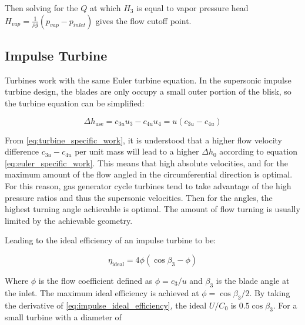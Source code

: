 Then solving for the $Q$ at which $H_3$ is equal to vapor pressure head $H_{vap}=\frac{1}{\rho g}\left(p_{vap}-p_{inlet}\right)$ gives the flow cutoff point.




\subsection{Impulse Turbine}


Turbines work with the same Euler turbine equation. In the supersonic impulse turbine design, the blades are only occupy a small outer portion of the blisk, so the turbine equation can be simplified:

\begin{equation}
    \Delta h_{\textrm{use}}=c_{3u}u_3-c_{4u}u_4=u(c_{3u}-c_{4u})
    \label{eq:turbine_specific_work}
\end{equation}

From \cref{eq:turbine_specific_work}, it is understood that a higher flow velocity difference $c_{3u}-c_{4u}$ per unit mass will lead to a higher $\Delta h_0$ according to equation \cref{eq:euler_specific_work}. This means that high absolute velocities, and for the maximum amount of the flow angled in the circumferential direction is optimal. For this reason, gas generator cycle turbines tend to take advantage of the high pressure ratios and thus the supersonic velocities. Then for the angles, the highest turning angle achievable is optimal. The amount of flow turning is usually limited by the achievable geometry.



Leading to the ideal efficiency of an impulse turbine to be:

\begin{equation}
    \eta_{\textrm{ideal}} = 4\phi(\cos\beta_3-\phi)
    \label{eq:impulse_ideal_efficiency}
\end{equation}

Where $\phi$ is the flow coefficient defined as $\phi=c_3/u$ and $\beta_3$ is the blade angle at the inlet. The maximum ideal efficiency is achieved at $\phi=\cos\beta_3/2$. By taking the derivative of \cref{eq:impulse_ideal_efficiency}, the ideal $U/C_0$ is $0.5\cos\beta_3$. For a small turbine with a diameter of 


